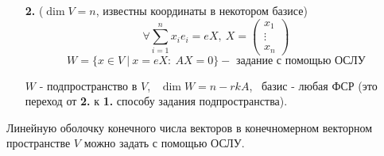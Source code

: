 \begin{enumerate}
    \item[\textbf{2.}] ($\dim V = n$, известны координаты в некотором базисе)
    $$\forall \sum \limits_{i=1}^n x_ie_i = eX , \ X = \begin{pmatrix}
    x_1 \\ \vdots \\ x_n
    \end{pmatrix}$$
    $$W = \{x \in V \ | \ x = eX : \ AX = 0\} - \text{ задание с помощью ОСЛУ}$$
    \begin{subtheorem}
      $W$ - подпространство в $V$,  \ $\dim W = n - rkA$, \ базис - любая ФСР (это переход от \textbf{2.} к \textbf{1.} способу задания подпространства).
    \end{subtheorem} 
  \end{enumerate}
  \begin{theorem}
    Линейную оболочку конечного числа векторов в конечномерном векторном пространстве $V$ можно задать с помощью ОСЛУ.
  \end{theorem}
